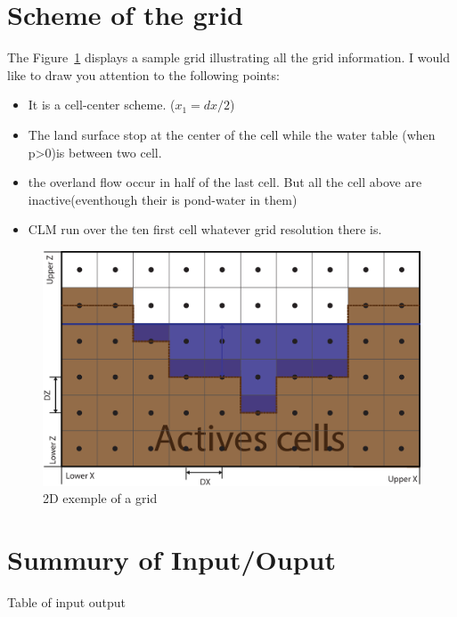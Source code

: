 \documentclass[11pt,a4paper]{report}
\begin{document}
\section{Scheme of the grid}
The Figure~\ref{fig:grid} displays a sample grid illustrating all the grid information. I would like to draw you attention to the following points:
\begin{itemize}
\item It is a cell-center scheme. ($x_1=dx/2$)
\item The land surface stop at the center of the cell while the water table (when p>0)is between two cell. 
\item the overland flow occur in half of the last cell. But all the cell above are inactive(eventhough their is pond-water in them)
\item CLM run over the ten first cell whatever grid resolution there is.
\end{itemize}
\begin{figure}[hbtp]
\caption{2D exemple of a grid}
\label{fig:grid}
\centering
\includegraphics[width=\textwidth]{GRID.eps}
\end{figure}


\section{Summury of Input/Ouput}

Table of input output
\end{document}
